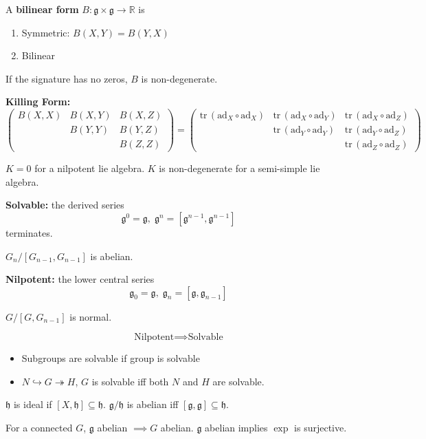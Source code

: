 \documentclass[12pt]{article}
\newcommand{\R}{\mathbb{R}}
\newcommand{\tr}{\text{tr}\,}
\newcommand{\g}{\mathfrak{g}}
\newcommand{\h}{\mathfrak{h}}
\newcommand{\ad}{\text{ad}}
\begin{document}
A \textbf{bilinear form} $B: \g \times \g \to \R$ is 
\begin{enumerate}
    \item Symmetric: $B(X, Y) = B(Y, X)$
    \item Bilinear
\end{enumerate}

If the signature has no zeros, $B$ is non-degenerate.

\textbf{Killing Form:}
\[\begin{pmatrix}
    B(X, X) & B(X, Y) & B(X, Z)\\ 
    & B(Y, Y) & B(Y, Z)\\
    && B(Z, Z)
\end{pmatrix} = \begin{pmatrix}
    \tr(\ad_X \circ \ad_X) & \tr(\ad_X \circ \ad_Y) & \tr(\ad_X \circ \ad_Z)\\ 
    & \tr(\ad_Y \circ \ad_Y) & \tr(\ad_Y \circ \ad_Z)\\
    && \tr(\ad_Z \circ \ad_Z)
\end{pmatrix}\]

$K = 0$ for a nilpotent lie algebra. $K$ is non-degenerate for a semi-simple lie algebra.

\textbf{Solvable:} the derived series 
\[\g^0 = \g, \; \g^n = [\g^{n-1}, \g^{n-1}]\]
terminates. 

$G_n/[G_{n-1}, G_{n-1}]$ is abelian.

\textbf{Nilpotent:} the lower central series 
\[\g_0 = \g, \; \g_n = [\g, \g_{n-1}]\]

$G/[G, G_{n-1}]$ is normal. 

\[\text{Nilpotent} \implies \text{Solvable}\]

\begin{itemize}
    \item Subgroups are solvable if group is solvable 
    \item $N \hookrightarrow G \twoheadrightarrow H$, $G$ is solvable iff both $N$ and $H$ are solvable.
\end{itemize}

$\h$ is ideal if $[X, \h] \subseteq \h$. $\g/\h$ is abelian iff $[\g, \g] \subseteq \h$. 

For a connected $G$, $\g$ abelian $\implies G$ abelian. $\g$ abelian implies $\exp$ is surjective. 
\end{document}

